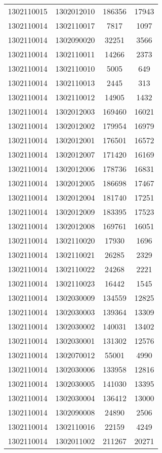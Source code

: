 \begin{longtable}[h]{llcc}
		1302110015 & 1302012010 & 186356 & 17943\\
		1302110014 & 1302110017 & 7817 & 1097\\
		1302110014 & 1302090020 & 32251 & 3566\\
		1302110014 & 1302110011 & 14266 & 2373\\
		1302110014 & 1302110010 & 5005 & 649\\
		1302110014 & 1302110013 & 2445 & 313\\
		1302110014 & 1302110012 & 14905 & 1432\\
		1302110014 & 1302012003 & 169460 & 16021\\
		1302110014 & 1302012002 & 179954 & 16979\\
		1302110014 & 1302012001 & 176501 & 16572\\
		1302110014 & 1302012007 & 171420 & 16169\\
		1302110014 & 1302012006 & 178736 & 16831\\
		1302110014 & 1302012005 & 186698 & 17467\\
		1302110014 & 1302012004 & 181740 & 17251\\
		1302110014 & 1302012009 & 183395 & 17523\\
		1302110014 & 1302012008 & 169761 & 16051\\
		1302110014 & 1302110020 & 17930 & 1696\\
		1302110014 & 1302110021 & 26285 & 2329\\
		1302110014 & 1302110022 & 24268 & 2221\\
		1302110014 & 1302110023 & 16442 & 1545\\
		1302110014 & 1302030009 & 134559 & 12825\\
		1302110014 & 1302030003 & 139364 & 13309\\
		1302110014 & 1302030002 & 140031 & 13402\\
		1302110014 & 1302030001 & 131302 & 12576\\
		1302110014 & 1302070012 & 55001 & 4990\\
		1302110014 & 1302030006 & 133958 & 12816\\
		1302110014 & 1302030005 & 141030 & 13395\\
		1302110014 & 1302030004 & 136412 & 13000\\
		1302110014 & 1302090008 & 24890 & 2506\\
		1302110014 & 1302110016 & 22159 & 4249\\
		1302110014 & 1302011002 & 211267 & 20271\\

\end{longtable}
